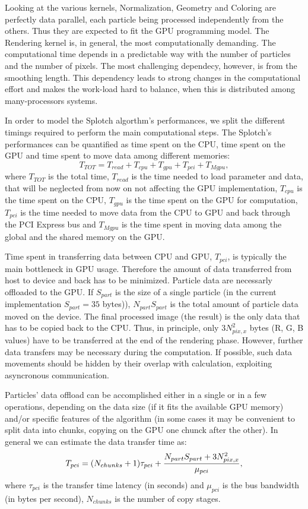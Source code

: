 \documentclass[11pt]{article}
\begin{document}
Looking at the various kernels, Normalization, Geometry and Coloring are  
perfectly data parallel, each particle being processed independently from the others.
Thus they are expected to fit the GPU programming model. 
The Rendering kernel is, in general, the most computationally demanding. 
The computational time depends in a predictable way with the number of particles and the number 
of pixels. The most challenging dependecy, however, is from the smoothing length. 
This dependency leads to strong changes in the computational effort and makes
the work-load hard to balance, when this is distributed among many-processors
systems.

In order to model the Splotch algorthm's performances, we split the different timings
required to perform the main computational steps. 
The Splotch's performances can be quantified as time spent on the CPU, time spent on the GPU
and time spent to move data among different memories:
\begin{equation}\label{Ts}
T_{TOT} = T_{read} + T_{cpu} + T_{gpu} + T_{pci} + T_{Mgpu},
\end{equation}
where $T_{TOT}$ is the total time, $T_{read}$ is the time needed to load parameter and data, that 
will be neglected from now on not affecting the GPU implementation, 
$T_{cpu}$ is the time spent on the CPU, $T_{gpu}$ is the time
spent on the GPU for computation, $T_{pci}$ is the time needed to move data from
the CPU to GPU and back through the PCI Express bus and $T_{Mgpu}$ is the time 
spent in moving data among the global and the shared memory on the GPU.

Time spent in transferring data
between CPU and GPU, $T_{pci}$, is typically the main 
bottleneck in GPU usage. Therefore the amount of data transferred from host
to device and back has to be minimized. 
Particle data are necessarly offloaded to the GPU. If $S_{part}$ is the
size of a single particle (in the current implementation $S_{part}=35$ bytes)),
$N_{part} S_{part}$ is the total amount of particle data moved on the device.
The final processed image (the result) is the only data that has to be copied back to
the CPU. Thus, in principle, only $3 N_{pix,x}^2$ bytes (R, G, B values) have to be transferred at
the end of the rendering phase. However, further data transfers may be necessary
during the computation. If possible, such data movements should be hidden
by their overlap with calculation, exploiting asyncronous communication.

Particles' data offload can be accomplished either in a single or in a few operations, 
depending on the data size (if it fits the available GPU memory) and/or
specific features of the algorithm (in some cases it may be convenient to
split data into chunks, copying on the GPU one chunck after the other).
In general we can estimate the data transfer time as:
\begin{equation}\label{pci}
T_{pci} =  (N_{chunks}+1) \tau_{pci} + {N_{part} S_{part} + 3 N_{pix,x}^2 \over 
\mu_{pci}},
\end{equation}
where $\tau_{pci}$ is the transfer time latency (in seconds) and $\mu_{pci}$ is the
bus bandwidth (in bytes per second), $N_{chunks}$ is the number 
of copy stages. 
\end{document}
